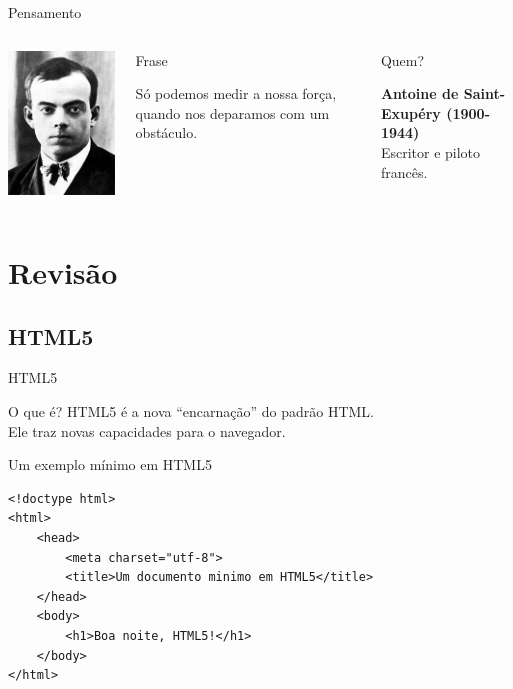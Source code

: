 \documentclass[xcolor=dvipsnames,table]{beamer}
\begin{document}
	\begin{frame}{Pensamento}
		\begin{columns}
		  		\begin{center}
		    		\includegraphics[height=.6\textheight]{images/exupery.jpg}
		  		\end{center}
				\begin{block}{Frase}
					\begin{center}
						{\large Só podemos medir a nossa força, quando nos deparamos com um obstáculo.}
					\end{center}
				\end{block}		  		
		  		\begin{block}{Quem?}
		  			\begin{center}
						{\bf Antoine de Saint-Exupéry (1900-1944)} \\ Escritor e piloto francês.
					\end{center}
				\end{block}
		\end{columns}
	\end{frame}
	
	\section{Revisão}
		
\subsection{HTML5}
\begin{frame}[fragile]{HTML5}
	\begin{block}{O que é?}
			HTML5 é a nova ``encarnação'' do padrão HTML. \\Ele traz novas capacidades para o navegador.
		\end{block} 
		\begin{block}{Um exemplo mínimo em HTML5}
			\begin{lstlisting}
<!doctype html>
<html>
	<head>
		<meta charset="utf-8">
		<title>Um documento minimo em HTML5</title>
	</head>
	<body>
		<h1>Boa noite, HTML5!</h1>
	</body>
</html>
\end{lstlisting}
		\end{block}
\end{frame}
\end{document}
